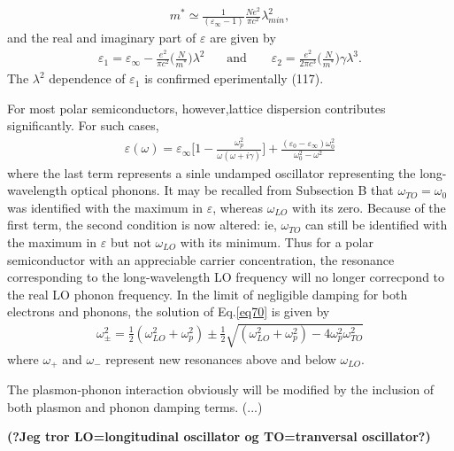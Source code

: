 \begin{align}
   m^* \simeq \frac{1}{(\varepsilon_{\infty}-1)} \frac{Ne^2}{\pi c^2} \lambda_{min}^2,
\end{align}
and the real and imaginary part of $\varepsilon$ are given by
\begin{align}
   \varepsilon_1 = \varepsilon_{\infty} - \frac{e^2}{\pi c^2} \Bigg( \frac{N}{m^*}\Bigg) \lambda^2
   \:\:\:\:\:\:\:\:\text{and}\:\:\:\:\:\:\:\:\:
   \varepsilon_2 = \frac{e^2}{2\pi c^3} \Bigg( \frac{N}{m^*}\Bigg) \gamma \lambda^3.
\end{align}
The $\lambda^2$ dependence of $\varepsilon_1$ is confirmed eperimentally (117).

For most polar semiconductors, however,lattice dispersion contributes significantly. For such cases,
\begin{align}
   \varepsilon (\omega) = \varepsilon_{\infty} \Bigg[ 1 - \frac{\omega_p^2}{\omega(\omega+i\gamma)}\Bigg]
         + \frac{(\varepsilon_0 - \varepsilon_{\infty})\omega_0^2}{\omega_0^2 - \omega^2}
         \label{eq70}
\end{align}
where the last term represents a sinle undamped oscillator representing the long-wavelength optical phonons.
It may be recalled from Subsection B that $\omega_{TO} = \omega_0$ was identified with the maximum
in $\varepsilon$, whereas $\omega_{LO}$ with its zero. Because of the first term, the second condition 
is now altered: ie, $\omega_{TO}$ can still be identified with the maximum in $\varepsilon$ 
but not $\omega_{LO}$ with its minimum. Thus for a polar semiconductor with an appreciable carrier
concentration, the resonance corresponding to the long-wavelength LO frequency will no longer
correcpond to the real LO phonon frequency. In the limit of negligible damping for both electrons and 
phonons, the solution of Eq.\eqref{eq70} is given by
\begin{align}
   \omega_{\pm}^2 = \frac{1}{2}(\omega_{LO}^2 + \omega_p^2) \pm \frac{1}{2} 
   \sqrt{(\omega_{LO}^2 + \omega_p^2) -4\omega_p^2 \omega_{TO}^2}
\end{align}
where $\omega_+$ and $\omega_-$ represent new resonances above and below $\omega_{LO}$.

The plasmon-phonon interaction obviously will be modified by the inclusion of both plasmon and
phonon damping terms. (...)

\textbf{(?Jeg tror LO=longitudinal oscillator og TO=tranversal oscillator?)}


\begin{thebibliography}{9}
\end{thebibliography}
